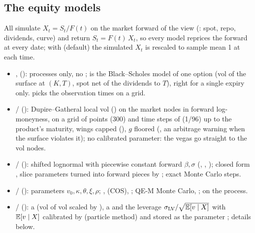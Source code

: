\subsection{The equity models}\label{sec:arch-equity-model-list}
All simulate $X_t = S_t/F(t)$ on the market forward of the  view (: spot, repo,
dividends, curve) and return $S_t = F(t)\,X_t$, so every model reprices the forward at every date; with
 (default) the simulated $X_t$ is rescaled to sample mean 1 at each time.
\begin{itemize}[nosep]
  \item {},  (): processes only, no
        ;  is the Black--Scholes
        model of one option (vol of the surface at $(K, T)$, spot net of the dividends to $T$), right for a single
        expiry only.  picks the observation times on a grid.
  \item {} /  (): Dupire--Gatheral local vol
        () on the market nodes in forward log-moneyness, on a grid of  points
        (300) and time steps of  (1/96) up to the product's maturity, wings capped
        (), $g$ floored (, an arbitrage warning when the surface violates it); no
        calibrated parameter: the vegas go straight to the vol nodes.
  \item {} /  (): shifted
        lognormal with piecewise constant forward $\beta, \sigma$ (, ,
        ); closed form , slice parameters turned into forward pieces
        by ; exact Monte Carlo steps.
  \item {} /  (): parameters $v_0, \kappa, \theta, \xi, \rho$;
        ,  (COS), ; QE-M Monte Carlo,
        ;  on the process.
  \item {} /  (): a  (vol of vol scaled by
        ), a  and the leverage $\sigma_{\mathrm{LV}}/\sqrt{\mathbb{E}[v \mid X]}$ with
        $\mathbb{E}[v \mid X]$ calibrated by  (particle method) and stored as the parameter
        ; details below.
\end{itemize}

